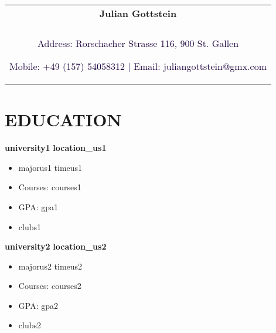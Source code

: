 \documentclass[a4paper,8pt]{article}
\begin{document}
\pagestyle{empty} 


\begin{tabularx}{\linewidth}{@{} C @{}}
\color[HTML]{1C033C} \Huge{\textbf{Julian Gottstein}} \\[6pt]
\\
\textcolor[HTML]{1C033C}{Address: Rorschacher Strasse 116, 900 St. Gallen}

\textcolor[HTML]{1C033C}{Mobile: +49 (157) 54058312 $|$}
\textcolor[HTML]{1C033C}{Email: juliangottstein@gmx.com}
\end{tabularx}

\section{EDUCATION}
\textbf{university1} \hfill \textbf{\color[HTML]{1C033C} location_us1} \\[-3ex]
\begin{itemize}[label={\large\textbullet}, left=0pt, itemsep=0.5ex, parsep=0.5ex]
    \item majorus1 \hfill \color[HTML]{1C033C} timeus1 \\[-3ex]
\end{itemize}
\begin{itemize}[label=$\circ$,itemsep=0.5ex,parsep=0.5ex]
    \item Courses: courses1
    \item GPA: gpa1
    \item clubs1
\end{itemize}

\textbf{university2} \hfill \textbf{\color[HTML]{1C033C} location_us2} \\[-3ex]
\begin{itemize}[label={\large\textbullet}, left=0pt, itemsep=0.5ex, parsep=0.5ex]
    \item majorus2 \hfill \color[HTML]{1C033C} timeus2 \\[-3ex]
\end{itemize}
\begin{itemize}[label=$\circ$,itemsep=0.5ex,parsep=0.5ex]
    \item Courses: courses2
    \item GPA: gpa2
    \item clubs2
\end{itemize}

\end{document}
